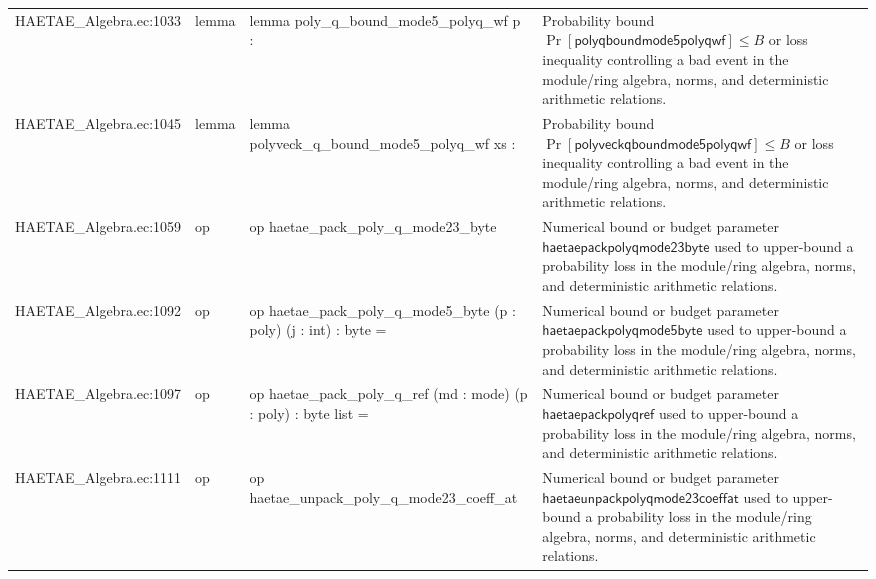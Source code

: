 \documentclass[10pt]{article}
\begin{document}
\begin{longtable}{L{0.11\textwidth}L{0.055\textwidth}L{0.385\textwidth}L{0.41\textwidth}}
HAETAE\_\allowbreak{}Algebra.\allowbreak{}ec:\allowbreak{}1033 & lemma & {\ttfamily\scriptsize lemma poly\_\allowbreak{}q\_\allowbreak{}bound\_\allowbreak{}mode5\_\allowbreak{}polyq\_\allowbreak{}wf p :} & Probability bound $\Pr[\mathsf{polyqboundmode5polyqwf}]\le B$ or loss inequality controlling a bad event in the module/ring algebra, norms, and deterministic arithmetic relations. \\
HAETAE\_\allowbreak{}Algebra.\allowbreak{}ec:\allowbreak{}1045 & lemma & {\ttfamily\scriptsize lemma polyveck\_\allowbreak{}q\_\allowbreak{}bound\_\allowbreak{}mode5\_\allowbreak{}polyq\_\allowbreak{}wf xs :} & Probability bound $\Pr[\mathsf{polyveckqboundmode5polyqwf}]\le B$ or loss inequality controlling a bad event in the module/ring algebra, norms, and deterministic arithmetic relations. \\
HAETAE\_\allowbreak{}Algebra.\allowbreak{}ec:\allowbreak{}1059 & op & {\ttfamily\scriptsize op haetae\_\allowbreak{}pack\_\allowbreak{}poly\_\allowbreak{}q\_\allowbreak{}mode23\_\allowbreak{}byte} & Numerical bound or budget parameter $\mathsf{haetaepackpolyqmode23byte}$ used to upper-bound a probability loss in the module/ring algebra, norms, and deterministic arithmetic relations. \\
HAETAE\_\allowbreak{}Algebra.\allowbreak{}ec:\allowbreak{}1092 & op & {\ttfamily\scriptsize op haetae\_\allowbreak{}pack\_\allowbreak{}poly\_\allowbreak{}q\_\allowbreak{}mode5\_\allowbreak{}byte (p : poly) (j : int) : byte =} & Numerical bound or budget parameter $\mathsf{haetaepackpolyqmode5byte}$ used to upper-bound a probability loss in the module/ring algebra, norms, and deterministic arithmetic relations. \\
HAETAE\_\allowbreak{}Algebra.\allowbreak{}ec:\allowbreak{}1097 & op & {\ttfamily\scriptsize op haetae\_\allowbreak{}pack\_\allowbreak{}poly\_\allowbreak{}q\_\allowbreak{}ref (md : mode) (p : poly) : byte list =} & Numerical bound or budget parameter $\mathsf{haetaepackpolyqref}$ used to upper-bound a probability loss in the module/ring algebra, norms, and deterministic arithmetic relations. \\
HAETAE\_\allowbreak{}Algebra.\allowbreak{}ec:\allowbreak{}1111 & op & {\ttfamily\scriptsize op haetae\_\allowbreak{}unpack\_\allowbreak{}poly\_\allowbreak{}q\_\allowbreak{}mode23\_\allowbreak{}coeff\_\allowbreak{}at} & Numerical bound or budget parameter $\mathsf{haetaeunpackpolyqmode23coeffat}$ used to upper-bound a probability loss in the module/ring algebra, norms, and deterministic arithmetic relations. \\

\end{longtable}
\end{document}
